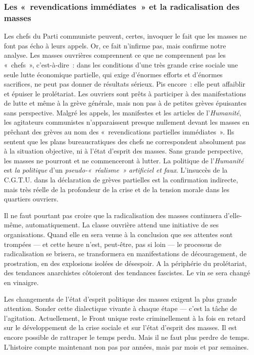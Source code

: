 \documentclass[french,twoside]{book} %
\begin{document}
 \subsubsection[{Les « revendications immédiates » et la radicalisation des masses}]{Les « revendications immédiates » et la radicalisation des masses}
\noindent Les chefs du Parti communiste peuvent, certes, invoquer le fait que les masses ne font pas écho à leurs appels. Or, ce fait n’infirme pas, mais confirme notre analyse. Les masses ouvrières comprennent ce que ne comprennent pas les « chefs », c’est-à-dire : dans les conditions d’une très grande crise sociale une seule lutte économique partielle, qui exige d’énormes efforts et d’énormes sacrifices, ne peut pas donner de résultats sérieux. Pis encore : elle peut affaiblir et épuiser le prolétariat. Les ouvriers sont prêts à participer à des manifestations de lutte et même à la grève générale, mais non pas à de petites grèves épuisantes sans perspective. Malgré les appels, les manifestes et les articles de l’\emph{Humanité}, les agitateurs communistes n’apparaissent presque nullement devant les masses en prêchant des grèves au nom des « revendications partielles immédiates ». Ils sentent que les plans bureaucratiques des chefs ne correspondent absolument pas à la situation objective, ni à l’état d’esprit des masses. Sans grande perspective, les masses ne pourront et ne commenceront à lutter. La politique de l’\emph{Humanité} est \emph{la politique} d’un \emph{pseudo-« réalisme » artificiel et faux}. L’insuccès de la C.G.T.U. dans la déclaration de grèves partielles est la confirmation indirecte, mais très réelle de la profondeur de la crise et de la tension morale dans les quartiers ouvriers.\par
Il ne faut pourtant pas croire que la radicalisation des masses continuera d’elle-même, automatiquement. La classe ouvrière attend une initiative de ses organisations. Quand elle en sera venue à la conclusion que ses attentes sont trompées — et cette heure n’est, peut-être, pas si loin — le processus de radicalisation se brisera, se transformera en manifestations de découragement, de prostration,  en des explosions isolées de désespoir. A la périphérie du prolétariat, des tendances anarchistes côtoieront des tendances fascistes. Le vin se sera changé en vinaigre.\par
Les changements de l’état d’esprit politique des masses exigent la plus grande attention. Sonder cette dialectique vivante à chaque étape — c’est la tâche de l’agitation. Actuellement, le Front unique reste criminellement à la fois en retard sur le développement de la crise sociale et sur l’état d’esprit des masses. Il est encore possible de rattraper le temps perdu. Mais il ne faut plus perdre de temps. L’histoire compte maintenant non pas par années, mais par mois et par semaines.
\end{document}
